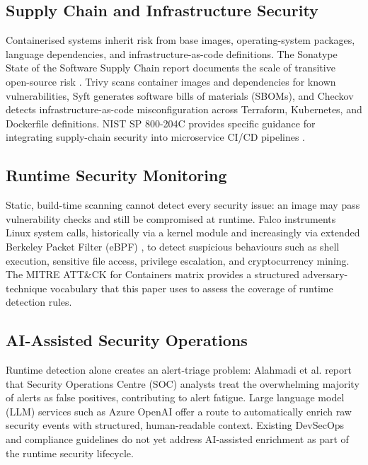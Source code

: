 \documentclass[conference]{IEEEtran}
\begin{document}
\subsection{Supply Chain and Infrastructure Security}
Containerised systems inherit risk from base images, operating-system packages, language dependencies, and infrastructure-as-code definitions. The Sonatype State of the Software Supply Chain report documents the scale of transitive open-source risk \cite{sonatype2023}. Trivy \cite{aqua2024} scans container images and dependencies for known vulnerabilities, Syft \cite{anchore2026} generates software bills of materials (SBOMs), and Checkov \cite{bridgecrew2024} detects infrastructure-as-code misconfiguration across Terraform, Kubernetes, and Dockerfile definitions. NIST SP 800-204C provides specific guidance for integrating supply-chain security into microservice CI/CD pipelines \cite{souppaya2023}.

\subsection{Runtime Security Monitoring}
Static, build-time scanning cannot detect every security issue: an image may pass vulnerability checks and still be compromised at runtime. Falco \cite{falco2024} instruments Linux system calls, historically via a kernel module and increasingly via extended Berkeley Packet Filter (eBPF) \cite{rice2022}, to detect suspicious behaviours such as shell execution, sensitive file access, privilege escalation, and cryptocurrency mining. The MITRE ATT\&CK for Containers matrix \cite{mitre2024} provides a structured adversary-technique vocabulary that this paper uses to assess the coverage of runtime detection rules.

\subsection{AI-Assisted Security Operations}
Runtime detection alone creates an alert-triage problem: Alahmadi et al. \cite{alahmadi2020} report that Security Operations Centre (SOC) analysts treat the overwhelming majority of alerts as false positives, contributing to alert fatigue. Large language model (LLM) services such as Azure OpenAI \cite{microsoft2024} offer a route to automatically enrich raw security events with structured, human-readable context. Existing DevSecOps and compliance guidelines \cite{owasp2023,cloudsecurityalliance2022,pcissc2022} do not yet address AI-assisted enrichment as part of the runtime security lifecycle.
\end{document}
